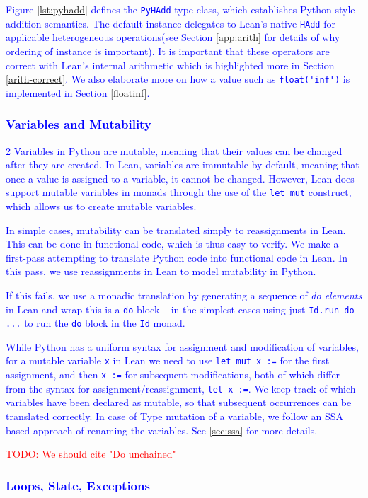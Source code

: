 \documentclass{article}
\newcommand{\code}{\lstinline}
\newcommand{\todo}[1]{\textcolor{red}{TODO: #1}}
\newcommand{\suggest}[1]{\textcolor{blue}{#1}}
\begin{document}
\suggest{
Figure \ref{lst:pyhadd} defines the \code{PyHAdd} type class, which establishes Python-style addition semantics. The default instance delegates to Lean's native \code{HAdd} for applicable heterogeneous operations(see Section \ref{app:arith} for details of why ordering of instance is important). It is important that these operators are correct with Lean's internal arithmetic which is highlighted more in Section \ref{arith-correct}. We also elaborate more on how a value such as \code{float('inf')} is implemented in Section \ref{floatinf}.

\subsubsection{Variables and Mutability}
2
Variables in Python are mutable, meaning that their values can be changed after they are created. In Lean, variables are immutable by default, meaning that once a value is assigned to a variable, it cannot be changed. However, Lean does support mutable variables in monads through the use of the \code{let mut} construct, which allows us to create mutable variables.

In simple cases, mutability can be translated simply to reassignments in Lean. This can be done in functional code, which is thus easy to verify. We make a first-pass attempting to translate Python code into functional code in Lean. In this pass, we use reassignments in Lean to model mutability in Python.

If this fails, we use a monadic translation by generating a sequence of \emph{do elements} in Lean and wrap this is a \code{do} block -- in the simplest cases using just \code{Id.run do ...} to run the \code{do} block in the \code{Id} monad.

While Python has a uniform syntax for assignment and modification of variables, for a mutable variable \code{x} in Lean we need to use \code{let mut x :=} for the first assignment, and then \code{x :=} for subsequent modifications, both of which differ from the syntax for assignment/reassignment, \code{let x :=}. We keep track of which variables have been declared as mutable, so that subsequent occurrences can be translated correctly. \suggest{In case of Type mutation of a variable, we follow an SSA based approach of renaming the variables. See \ref{sec:ssa} for more details.}

\todo{We should cite "Do unchained"}

\subsubsection{Loops, State, Exceptions}\label{sec:loops}

}
\end{document}
